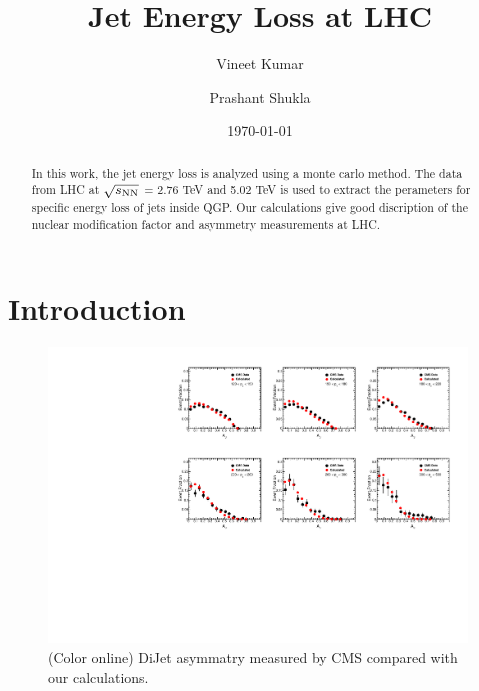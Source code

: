 \documentclass[reprint,amsmath,amssymb,aps,prc,showpacs,showkeys]{revtex4-1}
\begin{document}
\newcommand{\fm}{\mbox{fm}}
\newcommand{\MeV}{\mbox{MeV}}
\newcommand{\GeV}{\mbox{GeV}}

\title{Jet Energy Loss at LHC}



\author{Vineet Kumar}

\author{Prashant Shukla}

\date{\today}



\begin{abstract}
  In this work, the jet energy loss is analyzed using a monte carlo method.
  The data from LHC at $\sqrt{s_{\rm NN}}$ = 2.76 TeV and 5.02 TeV is used to extract
  the perameters for specific energy loss of jets inside QGP. Our calculations give
  good discription of the nuclear modification factor and asymmetry measurements at
  LHC.
\end{abstract}


\maketitle

\section{Introduction}
\label{Sec:Introduction}


\begin{figure}
\includegraphics[width=0.99\textwidth]{Figures/Fig_Asym_DiJet_Pt.pdf}
\caption{(Color online) DiJet asymmatry measured by CMS compared with our calculations.}
\label{Fig:DiJetAsymPt}
\end{figure}
\end{document}
